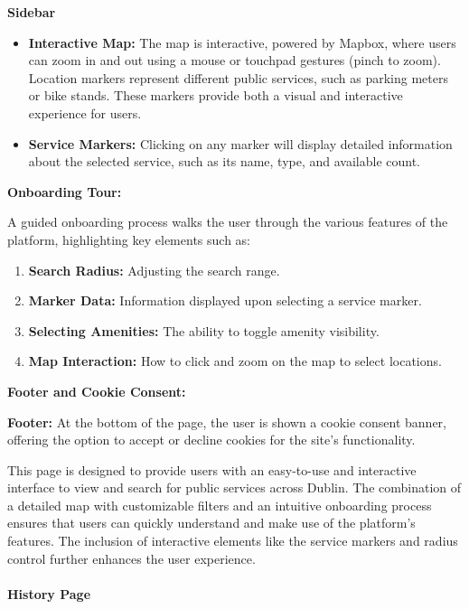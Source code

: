 \newpage{}

\textbf{Sidebar}

\begin{itemize}
    \item{} \textbf{Interactive Map:} The map is interactive, powered by Mapbox,
    where users can zoom in and out using a mouse or touchpad gestures (pinch to
    zoom). Location markers represent different public services, such as parking
    meters or bike stands. These markers provide both a visual and interactive
    experience for users.
    \item{} \textbf{Service Markers:} Clicking on any marker will display
    detailed information about the selected service, such as its name, type, and
    available count.
\end{itemize}

\textbf{Onboarding Tour:}

A guided onboarding process walks the user through the various features of the
platform, highlighting key elements such as:

\begin{enumerate}
    \item{} \textbf{Search Radius:} Adjusting the search range.
    \item{} \textbf{Marker Data:} Information displayed upon selecting a service
    marker.
    \item{} \textbf{Selecting Amenities:} The ability to toggle amenity
    visibility.
    \item{} \textbf{Map Interaction:} How  to click and zoom on the map to
    select locations.
\end{enumerate}

\textbf{Footer and Cookie Consent:}

\textbf{Footer:} At the bottom of the page, the user is shown a cookie consent
banner, offering the option to accept or decline cookies for the site's
functionality.

This page is designed to provide users with an easy{-}to{-}use and interactive
interface to view and search for public services across Dublin. The combination
of a detailed map with customizable filters and an intuitive onboarding process
ensures that users can quickly understand and make use of the platform's
features. The inclusion of interactive elements like the service markers and
radius control further enhances the user experience.


\paragraph{History Page}\mbox{}

